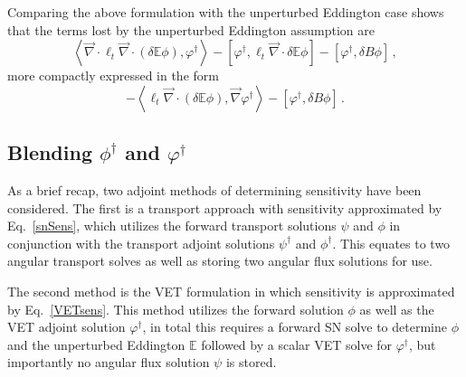 \documentclass[12pt]{report}
\newcommand{\bra}{\left\langle}
\newcommand{\ket}{\right\rangle}
\newcommand{\sbra}{\left[}
\newcommand{\sket}{\right]}
\renewcommand{\div}{\vec{\nabla} \cdot}
\newcommand{\grad}{\vec{\nabla}}
\newcommand{\vefadj}{\varphi^\dag}
\newcommand{\Edd}{\mathbb{E}}
\newcommand{\BEdd}{B}
\newcommand{\isigt}{\ell_t}
\begin{document}
Comparing the above formulation with the unperturbed Eddington case shows that the terms lost by the unperturbed Eddington assumption are 
\begin{equation}
\label{EddErrLong}
 \bra \div \isigt \div \left( \delta \Edd \phi \right), \vefadj \ket
- \sbra  \vefadj ,\isigt \div \delta \Edd \phi \sket
- \sbra \vefadj, \delta \BEdd \phi \sket \,,
\end{equation} 
more compactly expressed in the form
\begin{equation}
\label{EddErr}
 - \bra  \isigt \div \left( \delta \Edd \phi \right), \grad \vefadj \ket
- \sbra \vefadj, \delta \BEdd \phi \sket \,.
\end{equation} 

\subsection{Blending $\phi^\dag$ and $\varphi^\dag$}
As a brief recap, two adjoint methods of determining sensitivity have been considered. The first is a transport approach with sensitivity approximated by Eq.~\eqref{snSens}, which utilizes the forward transport solutions $\psi$ and $\phi$ in conjunction with the transport adjoint solutions $\psi^\dag$ and $\phi^\dag$. This equates to two angular transport solves as well as storing two angular flux solutions for use. 

The second method is the VET formulation in which sensitivity is approximated by Eq.~\eqref{VETsens}. This method utilizes the forward solution $\phi$ as well as the VET adjoint solution $\vefadj$, in total this requires a forward SN solve to determine $\phi$ and the unperturbed Eddington $\Edd$ followed by a scalar VET solve for $\vefadj$, but importantly no angular flux solution $\psi$ is stored.
\end{document}
